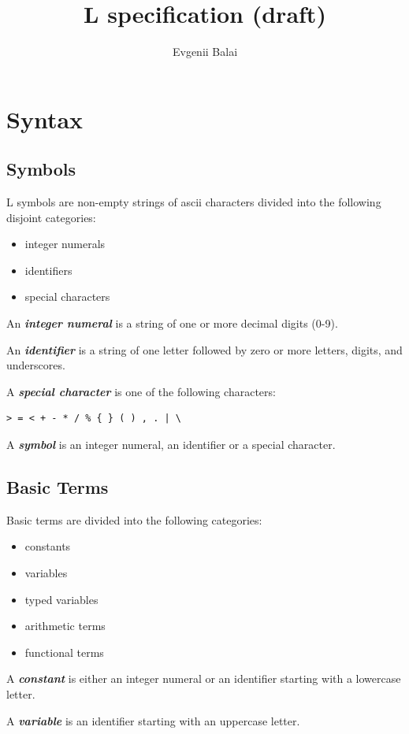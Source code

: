 \documentclass[a4paper,10pt]{article}
\title{L specification (draft)}
\author{Evgenii Balai}
\def\st{\noindent}
\begin{document}
\maketitle
\st
\setcounter{tocdepth}{2}
\tableofcontents
\section{Syntax}
\subsection{Symbols}\label{symbols}
L symbols are non-empty strings of ascii characters divided into the following disjoint categories:
\begin{itemize}
\item integer numerals
\item identifiers
\item special characters
\end{itemize}

An \textbf{\textit{integer numeral}} is a string of one or more decimal digits (0-9).


An \textbf{\textit{identifier}} is a string of one letter followed by zero or more letters, digits, and underscores.

A \textbf{\textit{special character}} is one of the following characters:
\begin{verbatim}
> = < + - * / % { } ( ) , . | \
\end{verbatim}

A \textbf{\textit{symbol}} is an integer numeral, an identifier or a special character.
\subsection{Basic Terms}
Basic terms are divided into the following categories:
\begin{itemize}
\item constants
\item variables
\item typed variables
\item arithmetic terms
\item functional terms
\end{itemize}

A \textit{\textbf{constant}} is either an integer numeral or an identifier starting with a lowercase letter.



A \textit{\textbf{variable}} is an identifier starting with an uppercase letter. 
\end{document}

